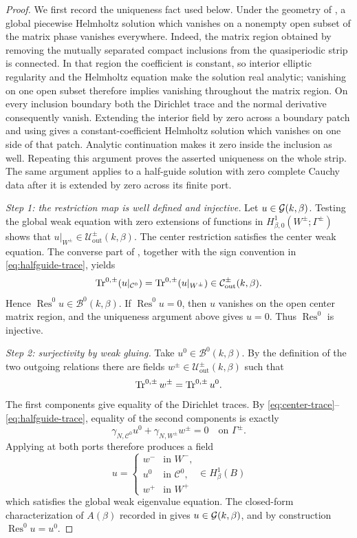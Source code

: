 \begin{proof}
We first record the uniqueness fact used below.  Under the geometry of
, a global piecewise Helmholtz solution which
vanishes on a nonempty open subset of the matrix phase vanishes everywhere.
Indeed, the matrix region obtained by removing the mutually separated compact
inclusions from the quasiperiodic strip is connected.  In that region the
coefficient is constant, so interior elliptic regularity and the Helmholtz
equation make the solution real analytic; vanishing on one open subset
therefore implies vanishing throughout the matrix region.  On every inclusion
boundary both the Dirichlet trace and the normal derivative consequently
vanish.  Extending the interior field by zero across a boundary patch and
using  gives a constant-coefficient Helmholtz solution
which vanishes on one side of that patch.  Analytic continuation makes it zero
inside the inclusion as well.  Repeating this argument proves the asserted
uniqueness on the whole strip.  The same argument applies to a half-guide
solution with zero complete Cauchy data after it is extended by zero across
its finite port.

\emph{Step 1: the restriction map is well defined and injective.}
Let $u\in\mathcal{G}(k,\beta)$.  Testing the global weak equation with zero extensions of
functions in $H^1_{\beta,0}(W^\pm;\Gamma^\pm)$ shows that
$u|_{W^\pm}\in\mathcal U^\pm_{\mathrm{out}}(k,\beta)$.  The center
restriction satisfies the center weak equation.  The converse part of
, together with the sign convention in
\eqref{eq:halfguide-trace}, yields
\[
  \operatorname{Tr}^{0,\pm}(u|_{\mathcal C^0})
  =\operatorname{Tr}^{0,\pm}(u|_{W^\pm})
  \in\mathcal C^\pm_{\mathrm{out}}(k,\beta).
\]
Hence $\operatorname{Res}^0u\in\mathcal B^0(k,\beta)$.  If
$\operatorname{Res}^0u=0$, then $u$ vanishes on the open center matrix
region, and the uniqueness argument above gives $u=0$.  Thus
$\operatorname{Res}^0$ is injective.

\emph{Step 2: surjectivity by weak gluing.}
Take $u^0\in\mathcal B^0(k,\beta)$.  By the definition of the two outgoing
relations there are fields $w^\pm\in\mathcal U^\pm_{\mathrm{out}}(k,\beta)$
such that
\[
  \operatorname{Tr}^{0,\pm}w^\pm=\operatorname{Tr}^{0,\pm}u^0.
\]
The first components give equality of the Dirichlet traces.  By
\eqref{eq:center-trace}--\eqref{eq:halfguide-trace}, equality of the second
components is exactly
\[
  \gamma_{N,\mathcal C^0}u^0+\gamma_{N,W^\pm}w^\pm=0
  \quad\text{on }\Gamma^\pm.
\]
Applying  at both ports therefore produces a field
\[
  u=\begin{cases}
    w^-&\text{in }W^-,\\
    u^0&\text{in }\mathcal C^0,\\
    w^+&\text{in }W^+
  \end{cases}
  \in H^1_\beta(B)
\]
which satisfies the global weak eigenvalue equation.  The closed-form
characterization of $A(\beta)$ recorded in  gives
$u\in\mathcal{G}(k,\beta)$, and by construction $\operatorname{Res}^0u=u^0$.


\end{proof}
